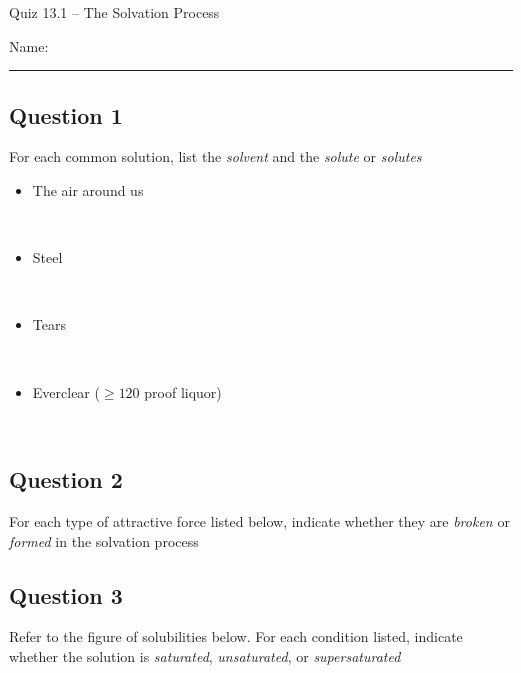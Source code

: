 \documentclass[11pt, letterpaper]{memoir}
\begin{document}
	\begin{center}
		{\large	Quiz 13.1 -- The Solvation Process}
	\end{center}
	{\large Name: \rule[-1mm]{4in}{.1pt} 

	\subsection*{Question 1}
  For each common solution, list the \emph{solvent} and the \emph{solute} or \emph{solutes}
  \begin{itemize}
    \item The air around us

      ~
    \item Steel

      ~
    \item Tears

      ~
    \item Everclear ($\geq120$ proof liquor)

      ~
  \end{itemize}

	\subsection*{Question 2}
  For each type of attractive force listed below, indicate whether they are \emph{broken} or \emph{formed} in the solvation process


  \vspace{2em}
  \subsection*{Question 3}
  Refer to the figure of solubilities below. For each condition listed, indicate whether the solution is \emph{saturated}, \emph{unsaturated}, or \emph{supersaturated}

}
\end{document}
